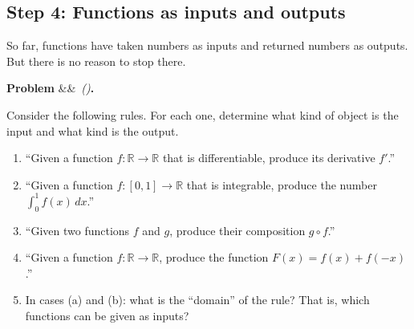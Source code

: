 \documentclass[12pt, a4paper]{article}
\newcounter{problem}
\newenvironment{problem}[1][]{%
  \refstepcounter{problem}%
  \par\vspace{6pt}%
  \noindent\textbf{\color{MidBlue}Problem \theproblem}%
  \ifx&#1&\else\ \textit{(#1)}\fi\textbf{.}\enskip
}{\par\vspace{4pt}}
\begin{document}
\begin{center}
\end{center}

\subsection{Step 4: Functions as inputs and outputs}

So far, functions have taken numbers as inputs and returned numbers as outputs. But there is no reason to stop there.

\begin{problem}
\label{prob:higher_order}
Consider the following rules. For each one, determine what kind of object is the input and what kind is the output.
\begin{enumerate}[label=(\alph*), topsep=2pt]
  \item ``Given a function $f : \mathbb{R} \to \mathbb{R}$ that is differentiable, produce its derivative $f'$.''
  \item ``Given a function $f : [0,1] \to \mathbb{R}$ that is integrable, produce the number $\displaystyle\int_0^1 f(x)\,dx$.''
  \item ``Given two functions $f$ and $g$, produce their composition $g \circ f$.''
  \item ``Given a function $f : \mathbb{R} \to \mathbb{R}$, produce the function $F(x) = f(x) + f(-x)$.''
  \item In cases (a) and (b): what is the ``domain'' of the rule? That is, which functions can be given as inputs?
\end{enumerate}
\end{problem}
\end{document}
